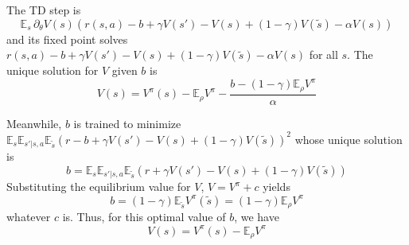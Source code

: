 \documentclass[11pt]{article}
\newcommand{\E}{\mathbb{E}}
\begin{document}
The TD step is
\begin{equation}
\E_s \,\partial_\theta V(s)\left(
r(s,a)-b+\gamma V(s')-V(s)+(1-\gamma)V(\tilde s)-\alpha V(s)
\right)
\end{equation}
and its fixed point solves $r(s,a)-b+\gamma V(s')-V(s)+(1-\gamma)V(\tilde
s)-\alpha V(s)$ for all $s$. The unique solution for $V$ given $b$ is
\begin{equation}
V(s)=V^\pi(s)-\E_\rho V^\pi-\frac{b-(1-\gamma)\E_\rho V^\pi}{\alpha}
\end{equation}

Meanwhile, $b$ is trained to minimize $\E_s\E_{s'|s,a}\E_{\tilde s} (r-b+\gamma
V(s')-V(s)+(1-\gamma)V(\tilde s))^2$ whose unique solution is
\begin{equation}
b=\E_s\E_{s'|s,a}\E_{\tilde s}(r+\gamma
V(s')-V(s)+(1-\gamma)V(\tilde s))
\end{equation}
Substituting the equilibrium value for $V$, $V=V^\pi+c$ yields
\begin{equation}
b=(1-\gamma)\E_{\tilde s} V^\pi(\tilde s)=(1-\gamma)\E_\rho V^\pi
\end{equation}
whatever $c$ is. Thus, for this optimal value of $b$, we have
\begin{equation}
V(s)=V^\pi(s)-\E_\rho V^\pi
\end{equation}
\end{document}
